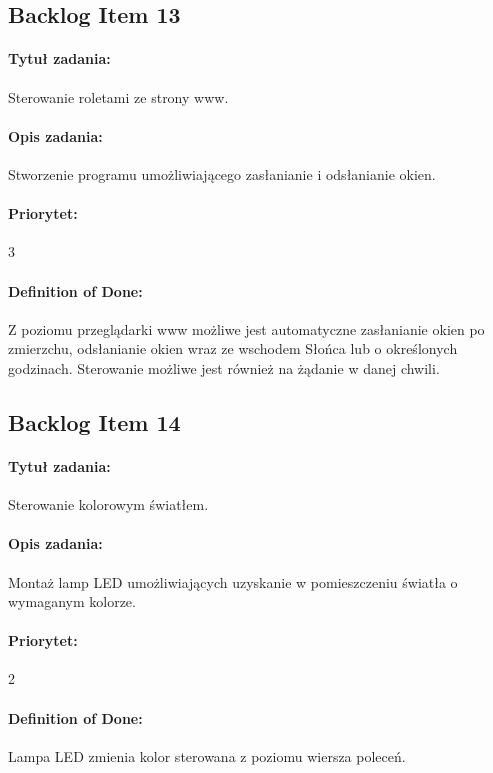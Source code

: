 	\subsection{Backlog Item 13}
	\paragraph{Tytuł zadania:}
	Sterowanie roletami ze strony www.
	
	\paragraph{Opis zadania:} 
	Stworzenie programu umożliwiającego zasłanianie i odsłanianie okien.
	
	\paragraph{Priorytet:}
	3
	
	\paragraph{Definition of Done:}
	Z poziomu przeglądarki www możliwe jest automatyczne zasłanianie okien po zmierzchu, odsłanianie okien wraz ze wschodem Słońca lub o określonych godzinach. Sterowanie możliwe jest również na żądanie w danej chwili.


	
	\subsection{Backlog Item 14}
	\paragraph{Tytuł zadania:}
	Sterowanie kolorowym światłem.
	
	\paragraph{Opis zadania:}
	Montaż lamp LED umożliwiających uzyskanie w pomieszczeniu światła o wymaganym kolorze.
	 
	\paragraph{Priorytet:}
	2
	
	\paragraph{Definition of Done:}
	Lampa LED zmienia kolor sterowana z poziomu wiersza poleceń.


